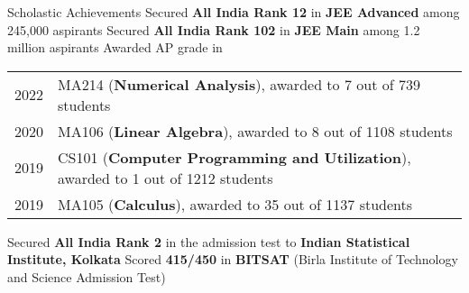 \begin{rubric}{Scholastic Achievements}
    \entry*[2019] Secured \textbf{All India Rank 12} in \textbf{JEE Advanced} among 245,000 aspirants
    \entry*[2019\phantom{}] Secured \textbf{All India Rank 102} in \textbf{JEE Main} among 1.2 million aspirants
    \entry* Awarded AP grade in
        
        \begin{tabular}{@{}ll}
           2022 & MA214 (\textbf{Numerical Analysis}), awarded to 7 out of 739 students \\
           2020 & MA106 (\textbf{Linear Algebra}), awarded to 8 out of 1108 students \\
           2019 & CS101 (\textbf{Computer Programming and Utilization}), awarded to 1 out of 1212 students \\
           2019 & MA105 (\textbf{Calculus}), awarded to 35 out of 1137 students \\
        \end{tabular}
    \entry*[2019\phantom{}] Secured \textbf{All India Rank 2} in the admission test to \textbf{Indian Statistical Institute, Kolkata}
    \entry*[2019] Scored \textbf{415/450} in \textbf{BITSAT} (Birla Institute of Technology and Science Admission Test)
\end{rubric}